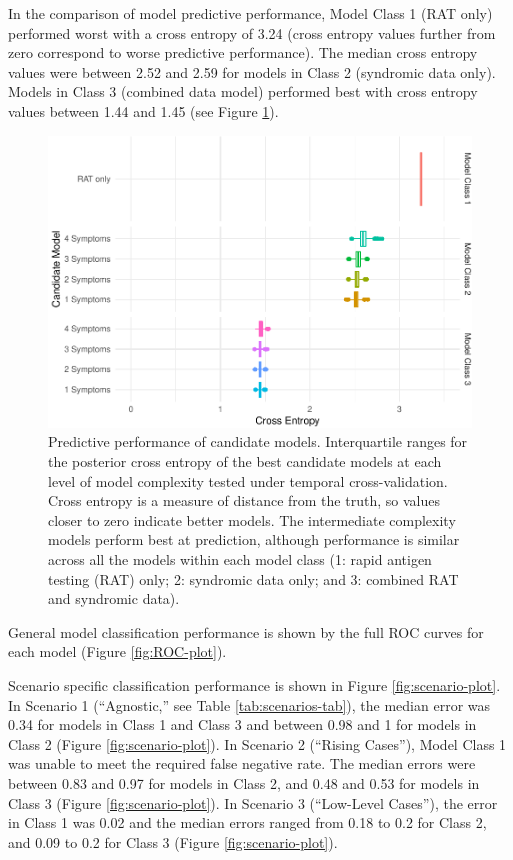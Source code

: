 \documentclass[]{elsarticle} %
\begin{document}
In the comparison of model predictive performance, Model Class 1 (RAT only) performed worst with a cross entropy of 3.24 (cross entropy values further from zero correspond to worse predictive performance).
The median cross entropy values were between 2.52 and 2.59 for models in Class 2 (syndromic data only).
Models in Class 3 (combined data model) performed best with cross entropy values between 1.44 and 1.45 (see Figure \ref{fig:pred-perf}).

\begin{figure}
\centering
\includegraphics{0501_MainText_files/figure-latex/pred-perf-1.pdf}
\caption{\label{fig:pred-perf}Predictive performance of candidate models. Interquartile ranges for the posterior cross entropy of the best candidate models at each level of model complexity tested under temporal cross-validation. Cross entropy is a measure of distance from the truth, so values closer to zero indicate better models. The intermediate complexity models perform best at prediction, although performance is similar across all the models within each model class (1: rapid antigen testing (RAT) only; 2: syndromic data only; and 3: combined RAT and syndromic data).}
\end{figure}

General model classification performance is shown by the full ROC curves for each model (Figure \ref{fig:ROC-plot}).

Scenario specific classification performance is shown in Figure \ref{fig:scenario-plot}.
In Scenario 1 (``Agnostic,'' see Table \ref{tab:scenarios-tab}), the median error was 0.34 for models in Class 1 and Class 3 and between 0.98 and 1 for models in Class 2 (Figure \ref{fig:scenario-plot}).
In Scenario 2 (``Rising Cases''), Model Class 1 was unable to meet the required false negative rate.
The median errors were between
0.83 and
0.97 for models in Class 2, and
0.48 and
0.53 for models in Class 3 (Figure \ref{fig:scenario-plot}).
In Scenario 3 (``Low-Level Cases''), the error in Class 1 was 0.02 and the median errors ranged from 0.18 to 0.2 for Class 2, and 0.09 to 0.2 for Class 3 (Figure \ref{fig:scenario-plot}).
\end{document}
